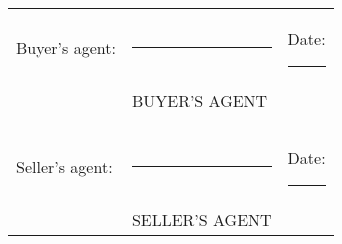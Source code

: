 \documentclass[10pt]{article}
\begin{document}
\vspace{1cm}
\noindent \begin{tabular}{l l l}
Buyer's agent: & \rule{6cm}{.2pt} & Date: \rule{2.4cm}{.2pt}\\
                         & BUYER'S AGENT      & \\\\\\
Seller's agent:          & \rule{6cm}{.2pt} & Date: \rule{2.4cm}{.2pt}\\
                         & SELLER'S AGENT      & \\
\end{tabular}
\end{document}
